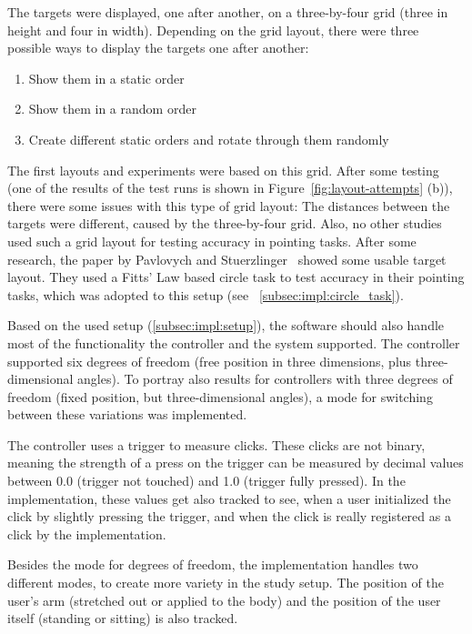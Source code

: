 The targets were displayed, one after another, on a three-by-four grid (three in height and four in width). Depending on the grid layout, there were three possible ways to display the targets one after another: 

\begin{enumerate}
    \item Show them in a static order
    \item Show them in a random order
    \item Create different static orders and rotate through them randomly
\end{enumerate}

The first layouts and experiments were based on this grid. After some testing (one of the results of the test runs is shown in Figure~\ref{fig:layout-attempts} (b)), there were some issues with this type of grid layout: The distances between the targets were different, caused by the three-by-four grid. Also, no other studies used such a grid layout for testing accuracy in pointing tasks. After some research, the paper by Pavlovych and Stuerzlinger~\cite{pavlovych_tradeoff_2009} showed some usable target layout. They used a Fitts' Law based circle task to test accuracy in their pointing tasks, which was adopted to this setup (see ~\ref{subsec:impl:circle_task}).
\newline

Based on the used setup (\ref{subsec:impl:setup}), the software should also handle most of the functionality the controller and the system supported. The controller supported six degrees of freedom (free position in three dimensions, plus three-dimensional angles). To portray also results for controllers with three degrees of freedom (fixed position, but three-dimensional angles), a mode for switching between these variations was implemented. 

The controller uses a  trigger to measure clicks. These clicks are not binary, meaning the strength of a press on the trigger can be measured by decimal values between 0.0 (trigger not touched) and 1.0 (trigger fully pressed). In the implementation, these values get also tracked to see, when a user initialized the click by slightly pressing the trigger, and when the click is really registered as a click by the implementation.

Besides the mode for degrees of freedom, the implementation handles two different modes, to create more variety in the study setup. The position of the user's arm (stretched out or applied to the body) and the position of the user itself (standing or sitting) is also tracked.

